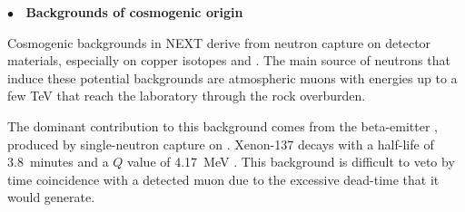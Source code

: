 
{\bf $\bullet$~ Backgrounds of cosmogenic origin}
\label{sec:muons}

Cosmogenic backgrounds in NEXT derive from neutron capture on detector materials, especially on copper isotopes and . The main source of neutrons that induce these potential backgrounds are atmospheric muons with energies up to a few TeV that reach the laboratory through the rock overburden. 


The dominant contribution to this background comes from the beta-emitter , produced by single-neutron capture on . Xenon-137 decays with a half-life of \SI{3.8}{minutes} and a $Q$ value of \SI{4.17}{\mega\eV} \cite{nudat}. This background is difficult to veto by time coincidence with a detected muon due to the excessive dead-time that it would generate. 


